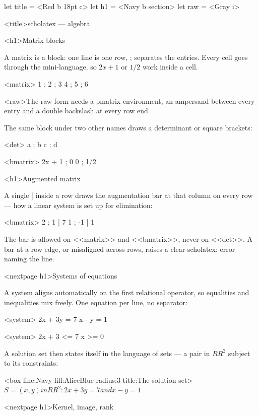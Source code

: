 \documentclass[
  margins=18,
  font=Latin Modern Roman,
  size=12,
  linespread=1.4,
  lang=en
]{scholatex}
\begin{document}
let title = <Red b 18pt c>
let h1    = <Navy b section>
let raw   = <Gray i>

<title>scholatex — algebra

<h1>Matrix blocks

A matrix is a block: one line is one row, ; separates the entries.
Every cell goes through the mini-language, so $2x + 1$ or $1/2$ work
inside a cell.

<matrix>{
	1 ; 2 ; 3
	4 ; 5 ; 6
}

<raw>The raw form needs a pmatrix environment, an ampersand between
every entry and a double backslash at every row end.

The same block under two other names draws a determinant or square
brackets:

<det>{
	a ; b
	c ; d
}

<bmatrix>{
	2x + 1 ; 0
	0 ; 1/2
}

<h1>Augmented matrix

A single | inside a row draws the augmentation bar at that column on
every row — how a linear system is set up for elimination:

<bmatrix>{
	2 ; 1 | 7
	1 ; -1 | 1
}

The bar is allowed on <<matrix>> and <<bmatrix>>, never on
<<det>>. A bar at a row edge, or misaligned across rows, raises a
clear scholatex: error naming the line.

<nextpage h1>Systems of equations

A system aligns automatically on the first relational operator, so
equalities and inequalities mix freely. One equation per line, no
separator:

<system>{
	2x + 3y = 7
	x - y = 1
}

<system>{
	2x + 3 <= 7
	x >= 0
}

A solution set then states itself in the language of sets — a pair in
$RR^2$ subject to its constraints:

<box line:Navy fill:AliceBlue radius:3 title:{The solution set}>{
	$S = {{ (x, y) in RR^2 : 2x + 3y = 7 and x - y = 1 }}$
}

<nextpage h1>Kernel, image, rank
\end{document}
